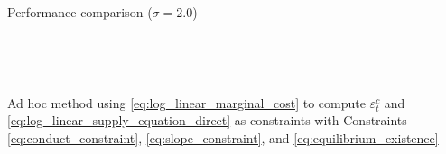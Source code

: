 \documentclass[11pt, a4paper]{article}
\theoremstyle{remark}
\begin{document}
\begin{table}[!htbp]
  \centering
  \caption{Performance comparison ($\sigma=2.0$)}
  \label{tb:loglinear_loglinear_sigma_2_simultaneous_theta_constraint_non_constraint_bias_rmse}

  \\[0.5em]
  \begin{adjustbox}{width=0.95\textwidth}
    
  \end{adjustbox}

  \vspace{1.5em}  %

  \\[0.5em]
  \begin{adjustbox}{width=0.95\textwidth}
    
  \end{adjustbox}
  \footnotesize
\end{table}


\begin{table}[!htbp]
  \centering
  \caption{Ad hoc method using \eqref{eq:log_linear_marginal_cost} to compute $\varepsilon_t^c$ and \eqref{eq:log_linear_supply_equation_direct} as constraints with Constraints \eqref{eq:conduct_constraint}, \eqref{eq:slope_constraint}, and \eqref{eq:equilibrium_existence}}
  \label{tb:loglinear_loglinear_sigma_2_mpec_theta_constraint_non_constraint_bias_rmse}

  \\[0.5em]
  \begin{adjustbox}{width=0.95\textwidth}
    
  \end{adjustbox}

  \vspace{1em}
  \\[0.5em]
  \begin{adjustbox}{width=0.95\textwidth}
    
  \end{adjustbox}
  \footnotesize
\end{table}
\end{document}
